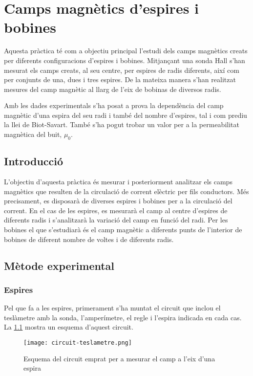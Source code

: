 \chapter{Camps magnètics d'espires i bobines}
\begin{resum}
Aquesta pràctica té com a objectiu principal l'estudi dels camps magnètics creats per diferents configuracions d'espires i bobines. Mitjançant una sonda Hall s'han mesurat els camps creats, al seu centre, per espires de radis diferents, així com per conjunts de una, dues i tres espires. De la mateixa manera s'han realitzat mesures del camp magnètic al llarg de l'eix de bobinas de diversos radis.

Amb les dades experimentals s'ha posat a prova la dependència del camp magnètic d'una espira del seu radi i també del nombre d'espires, tal i com prediu la llei de Biot-Savart. També s'ha pogut trobar un valor per a la permeabilitat magnètica del buit, \( \mu_0 \).
\end{resum}

\section{Introducció}
L'objectiu d'aquesta pràctica és mesurar i posteriorment analitzar els camps magnètics que resulten de la circulació de corrent elèctric per fils conductors. Més precisament, es disposarà de diverses espires i bobines per a la circulació del corrent. En el cas de les espires, es mesurarà el camp al centre d'espires de diferents radis i s'analitzarà la variació del camp en funció del radi. Per les bobines el que s'estudiarà és el camp magnètic a diferents punts de l'interior de bobines de diferent nombre de voltes i de diferents radis.

\section{Mètode experimental}
\subsection{Espires}
Pel que fa a les espires, primerament s'ha muntat el circuit que inclou el teslàmetre amb la sonda, l'amperímetre, el regle i l'espira indicada en cada cas. La \cref{fig:circuit teslametre} mostra un esquema d'aquest circuit.

\begin{figure}[htb]
  \centering \small \sffamily
  \texttt{[image: circuit-teslametre.png]}
  \caption{Esquema del circuit emprat per a mesurar el camp a l'eix d'una espira}
  \label{fig:circuit teslametre}
\end{figure}

